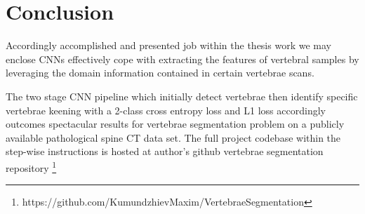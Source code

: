 \chapter{Conclusion}
\label{ch:conclusion}
Accordingly  accomplished and presented job within the thesis work we may enclose CNNs effectively cope with extracting the features of vertebral samples by leveraging the domain information contained in certain vertebrae scans.

The two stage CNN pipeline which initially detect vertebrae then identify specific vertebrae keening with a 2-class cross entropy loss  and L1 loss accordingly outcomes spectacular results for vertebrae segmentation problem on a publicly available pathological spine CT data set. The full project codebase within the step-wise instructions is hosted at author's github vertebrae segmentation repository \footnote{https://github.com/KumundzhievMaxim/VertebraeSegmentation}
